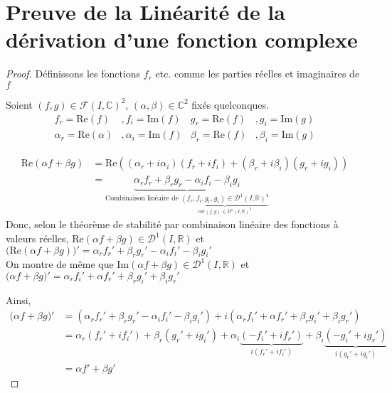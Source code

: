 \documentclass[french]{article}
\renewcommand{\Re}{\text{Re}}
\renewcommand{\Im}{\text{Im}}
\newcommand{\C}{\mathbb C}
\newcommand{\R}{\mathbb R}
\begin{document}
\section{Preuve de la Linéarité de la dérivation d'une fonction complexe}
\begin{proof}
	
Définissons les fonctions $f_r$ etc. comme les parties réelles et imaginaires de $f$ 

Soient $(f, g) \in \mathcal{F}(I, \C)^2$, $(\alpha, \beta) \in \C^2$ fixés quelconques.
\begin{align*}
	f_r = \Re(f) &, f_i = \Im(f) &g_r = \Re(f) &, g_i = \Im(g)\\
	\alpha_r = \Re(\alpha) &, \alpha_i = \Im(f) &\beta_r = \Re(f) &, \beta_i = \Im(g)
\end{align*}

\begin{align*}
	\Re( \alpha f + \beta g) &= \Re((\alpha_r + i \alpha_i)(f_r + i f_i) + (\beta_r+ i\beta_i)(g_r+ i g_i)) \\
	&= \underbrace{\alpha_r f_r + \beta_r g_r - \alpha_i f_i - \beta_i g_i}_{\text{Combinaison linéaire de } \underbrace{(f_r, f_i, g_r, g_i) \in \mathcal D^1(I, \R)^4}_{car (f,g) \in D^1(I, \R)^2}}
\end{align*}
Donc, selon le théorème de stabilité par combinaison linéaire des fonctions à valeurs réelles, $\Re(\alpha f + \beta g) \in \mathcal D^1(I, \R)$ et $\big(\Re(\alpha f + \beta g)\big)' = \alpha_r f_r' + \beta_r g_r' - \alpha_i f_i' - \beta_i g_i'$
\\
On montre de même que $\Im(\alpha f + \beta g) \in \mathcal D^1(I, \R)$ et $\big(\alpha f + \beta g\big)' = \alpha_r f_i' +\alpha f_r' +\beta_r g_i' +\beta_i g_r'$

Ainsi,
\begin{align*}
	\big( \alpha f + \beta g \big)' &= (\alpha_r f_r' + \beta_r g_r' - \alpha_i f_i' - \beta_i g_i') + i (\alpha_r f_i' +\alpha f_r' +\beta_r g_i' +\beta_i g_r') \\
	&= \alpha_r(f_r' + if_i') + \beta_r(g_r' + ig_i') + \alpha_i \underbrace{(-f_i' + if_r')}_{i(f_r' + if_i')} + \beta_i \underbrace{( -g_i' + ig_r')}_{i(g_r' + ig_i')} \\
	&=\alpha f' + \beta g'
\end{align*}

\end{proof}
\end{document}
